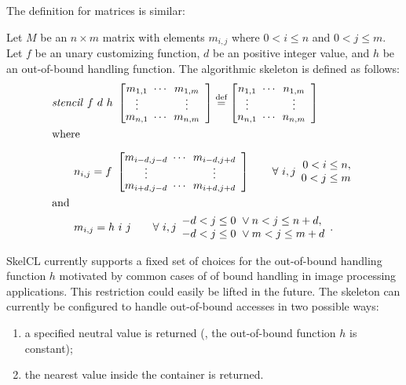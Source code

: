 \noindent
The definition for matrices is similar:
\begin{definition}
  \label{definition:mapoverlap:matrix}
  Let $M$ be an $n\times m$ matrix with elements $m_{i,j}$ where $0 < i \leq n$ and $0 < j \leq m$.
  Let $f$ be an unary customizing function, $d$ be an positive integer value, and $h$ be an out-of-bound handling function.
  The algorithmic skeleton \stencil is defined as follows:
  \begin{equation*}
    \begin{split}
    & \stencil\ f\  d\ h\ \DottedMatrix{m_{1,1}}{m_{1,m}}{m_{n,1}}{m_{n,m}}
               \eqdef \DottedMatrix{n_{1,1}}{n_{1,m}}{n_{n,1}}{n_{n,m}}\\
               &\text{where}\\[.5em]
    &\qquad n_{i,j} = f\ \DottedMatrix{m_{i-d,j-d}}{m_{i-d,j+d}}{m_{i+d,j-d}}{m_{i+d,j+d}} \qquad \forall\ i,j
        \begin{array}{r} 0 < i \leq n,\\ 0 < j \leq m \end{array}\\
        &\text{and}\\
    &\qquad m_{i,j} = h\ i\ j \qquad \forall\ i,j \begin{array}{l} -d < j \leq 0\ \vee n < j \leq n+d,\\ -d < j \leq 0\ \vee m < j \leq m+d \end{array} .
    \end{split}
  \end{equation*}
\end{definition}


SkelCL currently supports a fixed set of choices for the out-of-bound handling function $h$ motivated by common cases of of bound handling in image processing applications.
This restriction could easily be lifted in the future.
The \stencil skeleton can currently be configured to handle out-of-bound accesses in two possible ways:
\begin{enumerate}
  \item a specified neutral value is returned (\ie, the out-of-bound function $h$ is constant);
  \item the nearest value inside the container is returned.
\end{enumerate}

